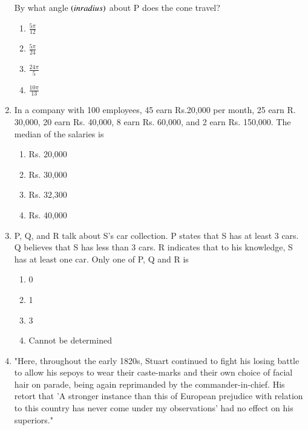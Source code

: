 \documentclass[journal,12pt,onecolumn]{IEEEtran}
\theoremstyle{remark}
\begin{document}
\begin{enumerate}
\begin{figure}[!ht]
\label{fig:my_label}
\end{figure}
By what angle $\left(in radius\right)$ about P does the cone travel?
\begin{enumerate}
    \item $\frac{5\pi}{12}$
    \item $\frac{5\pi}{24}$
    \item $\frac{24\pi}{5}$
    \item $\frac{10\pi}{13}$
\end{enumerate}
\item In a company with 100 employees, 45 earn Rs.20,000 per month, 25 earn R. 30,000, 20 earn Rs. 40,000, 8 earn Rs. 60,000, and 2 earn Rs. 150,000. The median of the salaries is 
\begin{enumerate}
    \item Rs. 20,000
    \item Rs. 30,000
    \item Rs. 32,300
    \item Rs. 40,000
\end{enumerate}
\item P, Q, and R talk about S's car collection. P states that S has at least 3 cars. Q believes that S has less than 3 cars. R indicates that to his knowledge, S has at least one car. Only one of P, Q and R is 
\begin{enumerate}
    \item 0
    \item 1
    \item 3
    \item Cannot be determined
\end{enumerate}
\item "Here, throughout the early 1820s, Stuart continued to fight his losing battle to allow his sepoys to wear their caste-marks and their own choice of facial hair on parade, being again reprimanded by the commander-in-chief. His retort that 'A stronger instance than this of European prejudice with relation to this country has never come under my observations' had no effect on his superiors."


\end{enumerate}
\end{document}
